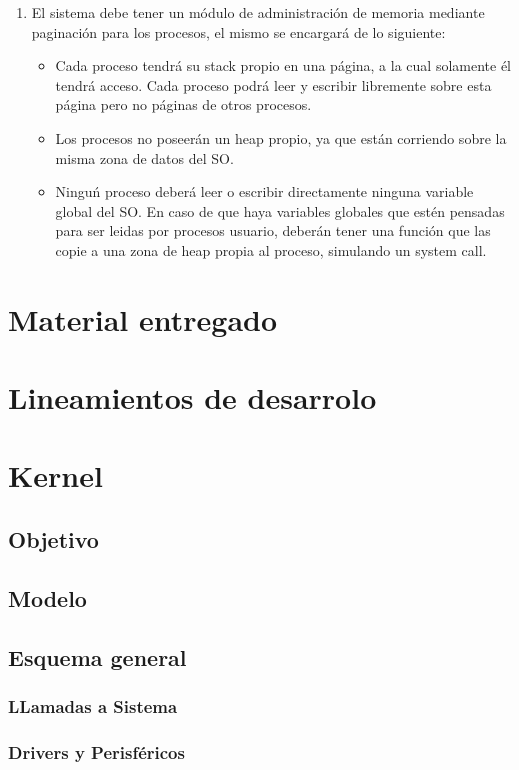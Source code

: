 \documentclass[10pt,a4paper]{article}
\begin{document}
\begin{enumerate}
			\item El sistema debe tener un m\'odulo de administraci\'on de memoria mediante paginaci\'on para los procesos, el mismo se encargar\'a de lo siguiente:
			\begin{itemize}
				\item Cada proceso tendr\'a su stack propio en una p\'agina, a la cual solamente  \'el tendr\'a acceso. Cada proceso podr\'a leer y escribir libremente sobre esta p\'agina pero no p\'aginas de otros procesos.
				\item Los procesos no poseer\'an un heap propio, ya que est\'an corriendo sobre la misma zona de datos del SO.
				\item Ningu\'n proceso deber\'a leer o escribir directamente ninguna variable global del SO. En caso de que haya variables globales que est\'en pensadas para ser leidas por procesos usuario, deber\'an tener una funci\'on que las copie a una zona de heap propia al proceso, simulando un system call.
			\end{itemize}
		\end{enumerate}

\section{Material entregado}
	
\section{Lineamientos de desarrolo}

\section{Kernel}
	\subsection{Objetivo}
	\subsection{Modelo}
	\subsection{Esquema general}
	\subsubsection{LLamadas a Sistema}
	\subsubsection{Drivers y Perisf\'ericos}
\end{document}
